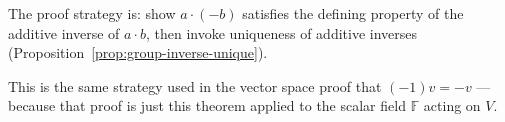 \begin{remark*}
\end{remark*}


\begin{remark}
The proof strategy is: show $a \cdot (-b)$ satisfies the defining
property of the additive inverse of $a \cdot b$, then invoke
uniqueness of additive inverses
(Proposition~\ref{prop:group-inverse-unique}).

This is the same strategy used in the vector space proof that
$(-1)v = -v$ --- because that proof is just this theorem applied
to the scalar field $\mathbb{F}$ acting on $V$.
\end{remark}
